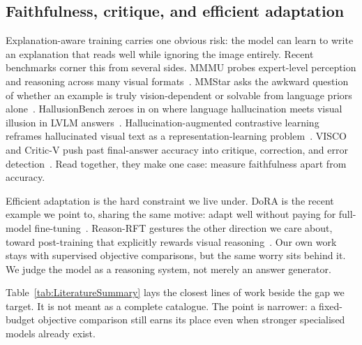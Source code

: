 \documentclass[preprint,12pt]{elsarticle}
\begin{document}
\subsection{Faithfulness, critique, and efficient adaptation}
Explanation-aware training carries one obvious risk: the model can learn to write an explanation that reads well while ignoring the image entirely.
Recent benchmarks corner this from several sides.
MMMU probes expert-level perception and reasoning across many visual formats~\cite{yue2024mmmu}.
MMStar asks the awkward question of whether an example is truly vision-dependent or solvable from language priors alone~\cite{chen2024mmstar}.
HallusionBench zeroes in on where language hallucination meets visual illusion in LVLM answers~\cite{guan2024hallusionbench}.
Hallucination-augmented contrastive learning reframes hallucinated visual text as a representation-learning problem~\cite{jiang2024hacl}.
VISCO and Critic-V push past final-answer accuracy into critique, correction, and error detection~\cite{wu2025visco,zhang2025criticv}.
Read together, they make one case: measure faithfulness apart from accuracy.

Efficient adaptation is the hard constraint we live under.
DoRA is the recent example we point to, sharing the same motive: adapt well without paying for full-model fine-tuning~\cite{liu2024dora}.
Reason-RFT gestures the other direction we care about, toward post-training that explicitly rewards visual reasoning~\cite{tan2025reasonrft}.
Our own work stays with supervised objective comparisons, but the same worry sits behind it.
We judge the model as a reasoning system, not merely an answer generator.

Table~\ref{tab:LiteratureSummary} lays the closest lines of work beside the gap we target.
It is not meant as a complete catalogue.
The point is narrower: a fixed-budget objective comparison still earns its place even when stronger specialised models already exist.
\end{document}
